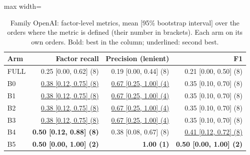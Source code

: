 \begin{table}[htbp]
\centering\footnotesize
\begin{adjustbox}{max width=\textwidth}
\begin{tabular}{@{}lrrr@{}}
\toprule
Arm & Factor recall & Precision (lenient) & F1 \\
\midrule
FULL & 0.25 [0.00, 0.62] (8) & 0.19 [0.00, 0.44] (8) & 0.21 [0.00, 0.50] (8) \\
B0 & \underline{0.38 [0.12, 0.75] (8)} & \underline{0.67 [0.25, 1.00] (4)} & 0.35 [0.10, 0.70] (8) \\
B1 & \underline{0.38 [0.12, 0.75] (8)} & \underline{0.67 [0.25, 1.00] (4)} & 0.35 [0.10, 0.70] (8) \\
B2 & \underline{0.38 [0.12, 0.75] (8)} & \underline{0.67 [0.25, 1.00] (4)} & 0.35 [0.10, 0.70] (8) \\
B3 & \underline{0.38 [0.12, 0.75] (8)} & \underline{0.67 [0.25, 1.00] (4)} & 0.35 [0.10, 0.70] (8) \\
B4 & \textbf{0.50 [0.12, 0.88] (8)} & 0.38 [0.08, 0.67] (8) & \underline{0.41 [0.12, 0.72] (8)} \\
B5 & \textbf{0.50 [0.00, 1.00] (2)} & \textbf{1.00 (1)} & \textbf{0.50 [0.00, 1.00] (2)} \\
\bottomrule
\end{tabular}
\end{adjustbox}
\caption{Family OpenAI: factor-level metrics, mean [95\% bootstrap interval] over the orders where the metric is defined (their number in brackets). Each arm on its own orders. Bold: best in the column; underlined: second best.}
\label{tab:table1a_openai}
\end{table}